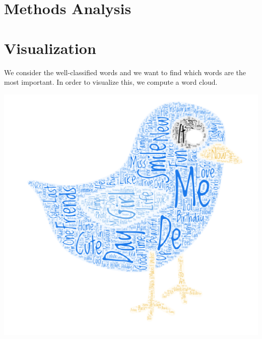 \documentclass[11pt,twocolumn]{report}
\begin{document}
\section *{Methods Analysis}

\section*{Visualization}
    We consider the well-classified words and we want to find which words are the most important. In order to visualize this, we compute a word cloud. 
    
    \begin{center}
    \includegraphics[scale=0.5]{cloud}
    \end{center}
%    
\end{document}
